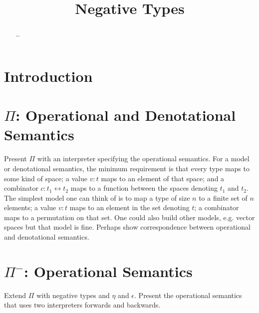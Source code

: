 \documentclass[authoryear,preprint]{sigplanconf}
\begin{document}
\lstset{breaklines=true, breakatwhitespace=true}
\lstset{numbers=none, numbersep=5pt, stepnumber=2, numberstyle=\scriptsize}
\lstset{rangeprefix=/*!\ , rangesuffix=\ !*\/, includerangemarker=false}

\title{Negative Types}
\authorinfo{}{}{}
\maketitle

\begin{abstract}
\ldots
\end{abstract}

\section{Introduction}

\section{$\Pi$: Operational and Denotational Semantics}

Present $\Pi$ with an interpreter specifying the operational semantics. For a
model or denotational semantics, the minimum requirement is that every type
maps to some kind of space; a value $v : t$ maps to an element of that space;
and a combinator $c : t_1 \leftrightarrow t_2$ maps to a function between the
spaces denoting $t_1$ and $t_2$. The simplest model one can think of is to
map a type of size $n$ to a finite set of $n$ elements; a value $v : t$ maps
to an element in the set denoting $t$; a combinator maps to a permutation on
that set. One could also build other models, e.g. vector spaces but that
model is fine. Perhaps show correspondence between operational and
denotational semantics.

\section{$\Pi^{-}$: Operational Semantics}

Extend $\Pi$ with negative types and $\eta$ and $\epsilon$. Present the
operational semantics that uses two interpreters forwards and backwards.  
\end{document}
